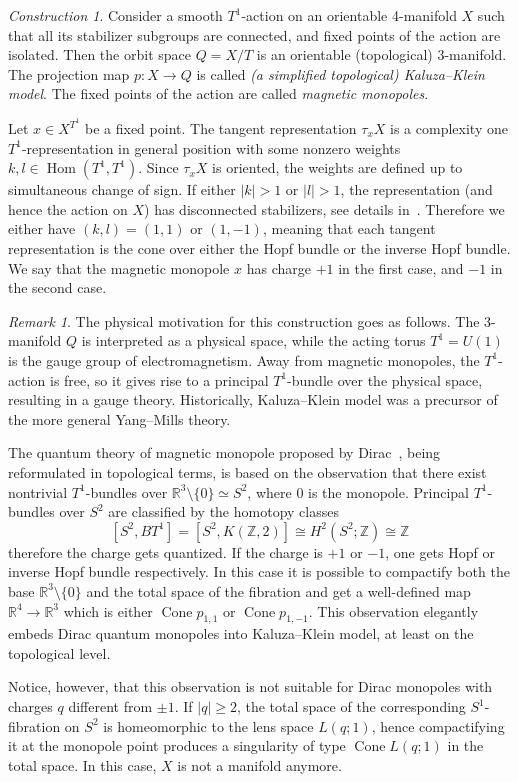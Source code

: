 \documentclass[english,12pt,oneside]{amsproc}
\DeclareMathOperator{\Cone}{Cone} \DeclareMathOperator{\pt}{pt}
\DeclareMathOperator{\Hom}{Hom} \DeclareMathOperator{\rk}{rk}
\newcommand{\Zo}{\mathbb{Z}}
\newcommand{\Ro}{\mathbb{R}}
\newcounter{stmcounter}[section]
\numberwithin{equation}{section}
\theoremstyle{plain}
\theoremstyle{definition}
\theoremstyle{remark}
\newtheorem{rem}[stmcounter]{Remark}
\newtheorem{con}[stmcounter]{Construction}
\begin{document}
\begin{con}\label{conKaluzaKlein}
Consider a smooth $T^1$-action on an orientable 4-manifold $X$ such that all its stabilizer subgroups are connected, and fixed points of the action are isolated. Then the orbit space $Q=X/T$ is an orientable (topological) 3-manifold. The projection map $p\colon X\to Q$ is called \emph{(a simplified topological) Kaluza--Klein model}. The fixed points of the action are called \emph{magnetic monopoles}.

Let $x\in X^{T^1}$ be a fixed point. The tangent representation $\tau_xX$ is a complexity one $T^1$-representation in general position with some nonzero weights $k,l\in\Hom(T^1,T^1)$. Since $\tau_xX$ is oriented, the weights are defined up to simultaneous change of sign. If either $|k|>1$ or $|l|>1$, the representation (and hence the action on $X$) has disconnected stabilizers, see details in~\cite{AyzCompl}. Therefore we either have $(k,l)=(1,1)$ or $(1,-1)$, meaning that each tangent representation is the cone over either the Hopf bundle or the inverse Hopf bundle. We say that the magnetic monopole $x$ has charge $+1$ in the first case, and $-1$ in the second case.
\end{con}

\begin{rem}
The physical motivation for this construction goes as follows. The 3-manifold $Q$ is interpreted as a physical space, while the acting torus $T^1=U(1)$ is the gauge group of electromagnetism. Away from magnetic monopoles, the $T^1$-action is free, so it gives rise to a principal $T^1$-bundle over the physical space, resulting in a gauge theory. Historically, Kaluza--Klein model was a precursor of the more general Yang--Mills theory.

The quantum theory of magnetic monopole proposed by Dirac~\cite{Dirac}, being reformulated in topological terms, is based on the observation that there exist nontrivial $T^1$-bundles over $\Ro^3\setminus\{0\}\simeq S^2$, where $0$ is the monopole. Principal $T^1$-bundles over $S^2$ are classified by the homotopy classes
\[
[S^2,BT^1]=[S^2,K(\Zo,2)]\cong H^2(S^2;\Zo)\cong\Zo
\]
therefore the charge gets quantized. If the charge is $+1$ or $-1$, one gets Hopf or inverse Hopf bundle respectively. In this case it is possible to compactify both the base $\Ro^3\setminus\{0\}$ and the total space of the fibration and get a well-defined map $\Ro^4\to\Ro^3$ which is either $\Cone p_{1,1}$ or $\Cone p_{1,-1}$. This observation elegantly embeds Dirac quantum monopoles into Kaluza--Klein model, at least on the topological level.

Notice, however, that this observation is not suitable for Dirac monopoles with charges $q$ different from $\pm1$. If $|q|\geqslant 2$, the total space of the corresponding $S^1$-fibration on $S^2$ is homeomorphic to the lens space $L(q;1)$, hence compactifying it at the monopole point produces a singularity of type $\Cone L(q;1)$ in the total space. In this case, $X$ is not a manifold anymore.
\end{rem}
\end{document}
